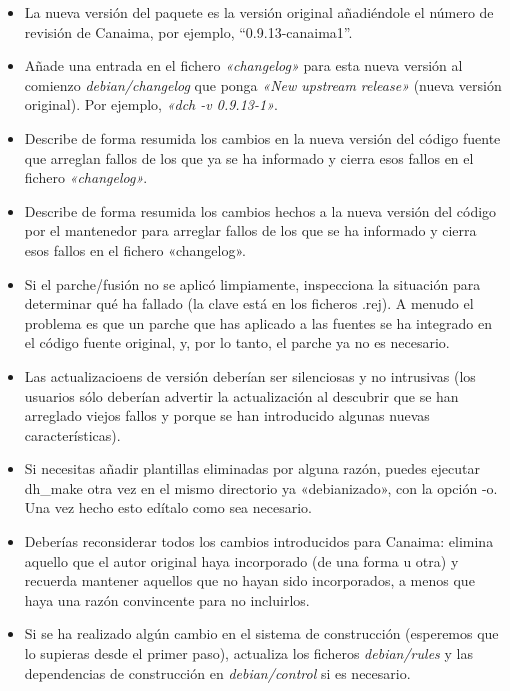 \documentclass[letterpaper,12pt,spanish]{manual}
\begin{document}
\begin{itemize}
\item {} 
La nueva versión del paquete es la versión original añadiéndole el número de revisión de Canaima, por ejemplo, ``0.9.13-canaima1''.

\item {} 
Añade una entrada en el fichero \emph{«changelog»} para esta nueva versión al comienzo \emph{debian/changelog} que ponga \emph{«New upstream release»} (nueva versión original). Por ejemplo, \emph{«dch -v 0.9.13-1»}.

\item {} 
Describe de forma resumida los cambios en la nueva versión del código fuente que arreglan fallos de los que ya se ha informado y cierra esos fallos en el fichero \emph{«changelog»}.

\item {} 
Describe de forma resumida los cambios hechos a la nueva versión del código por el mantenedor para arreglar fallos de los que se ha informado y cierra esos fallos en el fichero «changelog».

\item {} 
Si el parche/fusión no se aplicó limpiamente, inspecciona la situación para determinar qué ha fallado (la clave está en los ficheros .rej). A menudo el problema es que un parche que has aplicado a las fuentes se ha integrado en el código fuente original, y, por lo tanto, el parche ya no es necesario.

\item {} 
Las actualizacioens de versión deberían ser silenciosas y no intrusivas (los usuarios sólo deberían advertir la actualización al descubrir que se han arreglado viejos fallos y porque se han introducido algunas nuevas características).

\item {} 
Si necesitas añadir plantillas eliminadas por alguna razón, puedes ejecutar dh\_make otra vez en el mismo directorio ya «debianizado», con la opción -o. Una vez hecho esto edítalo como sea necesario.

\item {} 
Deberías reconsiderar todos los cambios introducidos para Canaima: elimina aquello que el autor original haya incorporado (de una forma u otra) y recuerda mantener aquellos que no hayan sido incorporados, a menos que haya una razón convincente para no incluirlos.

\item {} 
Si se ha realizado algún cambio en el sistema de construcción (esperemos que lo supieras desde el primer paso), actualiza los ficheros \emph{debian/rules} y las dependencias de construcción en \emph{debian/control} si es necesario.


\end{itemize}
\end{document}
